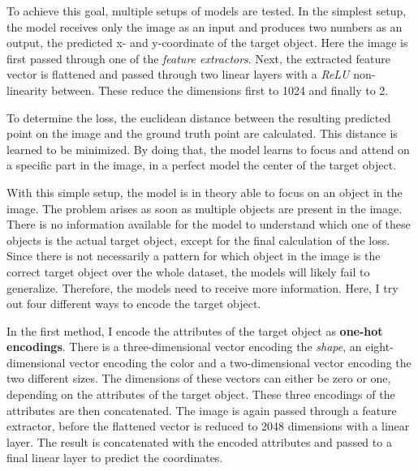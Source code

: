 To achieve this goal, multiple setups of models are tested.
In the simplest setup, the model receives only the image  as an input and produces two numbers as an output, the predicted x- and y-coordinate of the target object.
Here the image is first passed through one of the \emph{feature extractors}.
Next, the extracted feature vector is flattened and passed through two linear layers with a \emph{ReLU} non-linearity between.
These reduce the dimensions first to 1024 and finally to 2.

To determine the loss, the euclidean distance between the resulting predicted point on the image and the ground truth point are calculated.
This distance is learned to be minimized.
By doing that, the model learns to focus and attend on a specific part in the image, in a perfect model the center of the target object.

With this simple setup, the model is in theory able to focus on an object in the image.
The problem arises as soon as multiple objects are present in the image.
There is no information available for the model to understand which one of these objects is the actual target object, except for the final calculation of the loss.
Since there is not necessarily a pattern for which object in the image is the correct target object over the whole dataset, the models will likely fail to generalize. 
Therefore, the models need to receive more information.
Here, I try out four different ways to encode the target object.

In the first method, I encode the attributes of the target object as \textbf{one-hot encodings}.
There is a three-dimensional vector encoding the \emph{shape}, an eight-dimensional vector encoding the color and a two-dimensional vector encoding the two different sizes.
The dimensions of these vectors can either be zero or one, depending on the attributes of the target object.
These three encodings of the attributes are then concatenated.
The image is again passed through a feature extractor, before the flattened vector is reduced to 2048 dimensions with a linear layer.
The result is concatenated with the encoded attributes and passed to a final linear layer to predict the coordinates.

